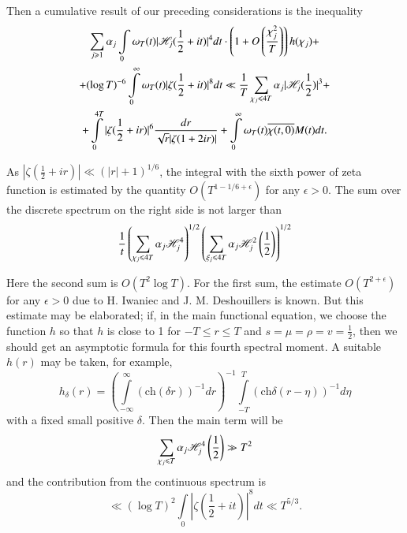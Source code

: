 Then a cumulative result of our preceding considerations is the inequality
\begin{gather}
\sum\limits_{j \geqslant 1} \alpha_j \int\limits_0 \omega_T (t) |\mathscr{H}_j (\frac{1}{2} + it)|^4 dt \cdot  \left(1+ O\left(\frac{\chi^2_j}{T} \right) \right) h(\chi_j) + \label{art7-eq10.2}\\
+ (\log T)^{-6} \int\limits^\infty_0 \omega_T (t) |\zeta(\frac{1}{2} + it)|^8 dt \ll \frac{1}{T} \sum\limits_{\chi_j \leqslant 4 T} \alpha_j |\mathscr{H}_j(\frac{1}{2})|^3 + \notag\\
+ \int\limits^{4T}_0 |\zeta(\frac{1}{2} +ir)|^6 \frac{dr}{\sqrt{r} |\zeta (1+ 2 ir)|} + \int\limits^\infty_0 \omega_T (t) \overline{\chi (t, 0)} M(t) dt.  \notag
\end{gather}

As $|\zeta (\frac{1}{2} + ir)| \ll (|r| + 1)^{1/6}$, the integral with the sixth power of zeta function is estimated by the quantity $O(T^{1-1/6+ \epsilon})$ for any $\epsilon >0$. The sum over the discrete spectrum on the right side is not larger than
\begin{equation}
\frac{1}{t} \left(\sum\limits_{\chi_j \leqslant 4 T} \alpha_j \mathscr{H}^4_j \right)^{1/2} \left(\sum\limits_{\xi_j \leqslant 4 T} \alpha_j \mathscr{H}^2_j  \left(\frac{1}{2} \right) \right)^{1/2} \label{art7-eq10.3}
\end{equation}

Here the second sum is $O(T^2 \log T)$. For the first sum, the estimate $O(T^{2+\epsilon})$ for any $\epsilon >0$ due to H. Iwaniec and J. M. Deshouillers is known. But this estimate may be elaborated; if, in the main functional equation, we choose the function $h$ so that $h$ is close to 1 for $-T \leqslant r \leqslant T$ and $s = \mu =\rho = v = \frac{1}{2} $, then we should get an asymptotic formula for this fourth spectral moment. A suitable $h(r)$ may be taken, for example,
\begin{equation}
h_\delta (r) = \left(\int\limits^\infty_{-\infty} (\text{ch} (\delta r))^{-1} dr \right)^{-1} \int\limits^T_{-T} (\text{ch} \delta (r -\eta))^{-1} d \eta\label{art7-eq10.4} 
\end{equation}
with a fixed small positive $\delta$. Then the main term will be
\begin{equation}
\sum\limits_{\chi_j \leqslant T} \alpha_j \mathscr{H}^4_j \left(\frac{1}{2} \right) \gg T^2 \label{art7-eq10.5}
\end{equation}
and the contribution from the continuous spectrum is 
\begin{equation}
\ll(\log T)^2 \int\limits_0 |\zeta (\frac{1}{2} + it)|^8 dt \ll T^{5/3} . \label{art7-eq10.6}
\end{equation}

